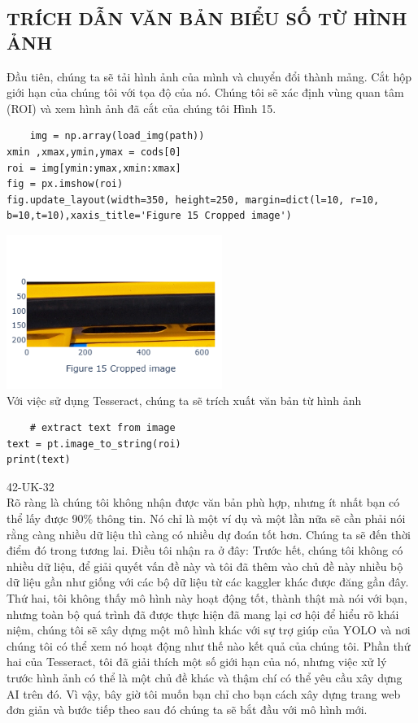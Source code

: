 \documentclass{article}
\begin{document}
\subsection{TRÍCH DẪN VĂN BẢN BIỂU SỐ TỪ HÌNH ẢNH}
Đầu tiên, chúng ta sẽ tải hình ảnh của mình và chuyển đổi thành mảng. Cắt hộp giới hạn của chúng tôi với tọa độ của nó. Chúng tôi sẽ xác định vùng quan tâm (ROI) và xem hình ảnh đã cắt của chúng tôi Hình 15.
\setlength{\parindent}{1cm}
\begin{verbatim}
    img = np.array(load_img(path))
xmin ,xmax,ymin,ymax = cods[0]
roi = img[ymin:ymax,xmin:xmax]
fig = px.imshow(roi)
fig.update_layout(width=350, height=250, margin=dict(l=10, r=10,
b=10,t=10),xaxis_title='Figure 15 Cropped image')
\end{verbatim}
\includegraphics[width= 7cm]{img/img/newplot.png}\\
Với việc sử dụng Tesseract, chúng ta sẽ trích xuất văn bản từ hình ảnh

\begin{verbatim}
    # extract text from image
text = pt.image_to_string(roi)
print(text)
\end{verbatim}

42-UK-32
\\

Rõ ràng là chúng tôi không nhận được văn bản phù hợp, nhưng ít nhất bạn có thể lấy được 90\% thông tin. Nó chỉ là một ví dụ và một lần nữa sẽ cần phải nói rằng càng nhiều dữ liệu thì càng có nhiều dự đoán tốt hơn. Chúng ta sẽ đến thời điểm đó trong tương lai. Điều tôi nhận ra ở đây: Trước hết, chúng tôi không có nhiều dữ liệu, để giải quyết vấn đề này và tôi đã thêm vào chủ đề này nhiều bộ dữ liệu gần như giống với các bộ dữ liệu từ các kaggler khác được đăng gần đây. Thứ hai, tôi không thấy mô hình này hoạt động tốt, thành thật mà nói với bạn, nhưng toàn bộ quá trình đã được thực hiện đã mang lại cơ hội để hiểu rõ khái niệm, chúng tôi sẽ xây dựng một mô hình khác với sự trợ giúp của YOLO và nơi chúng tôi có thể xem nó hoạt động như thế nào kết quả của chúng tôi. Phần thứ hai của Tesseract, tôi đã giải thích một số giới hạn của nó, nhưng việc xử lý trước hình ảnh có thể là một chủ đề khác và thậm chí có thể yêu cầu xây dựng AI trên đó. Vì vậy, bây giờ tôi muốn bạn chỉ cho bạn cách xây dựng trang web đơn giản và bước tiếp theo sau đó chúng ta sẽ bắt đầu với mô hình mới.
\end{document}
